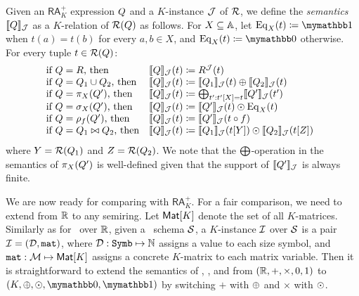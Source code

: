 Given an $\mathsf{RA}_{K}^+$ expression $Q$ and a $K$-instance $\mathcal{J}$ of $\mathcal{R}$, we define the \textit{semantics} $\llbracket Q \rrbracket_{\mathcal{J}}$ as a $K$-relation of $\mathcal{R}(Q)$ as follows. For $X \subseteq \mathbb{A}$, let $\operatorname{Eq}_X(t)\coloneqq  \kone$ when $t(a) = t(b)$ for every $a, b \in X$, and $\operatorname{Eq}_X(t)\coloneqq  \kzero$ otherwise. For every tuple $t \in \mathcal{R}(Q)$:
$$
\begin{array}{ll}
\!\!\!\text{if $\arae = R$, then} & \ssem{\arae}{\cJ}(t)\coloneqq  R^\cJ(t) \\
\!\!\!\text{if $\arae = \arae_1 \cup \arae_2$, then} & \ssem{\arae}{\cJ}(t)\coloneqq  \ssem{\arae_1}{\cJ}(t) \ksum \ssem{\arae_2}{\cJ}(t)  \\
\!\!\!\text{if $\arae = \pi_X(\arae')$, then} & \ssem{\arae}{\cJ}(t)\coloneqq  \bigksum_{t': t'[X] = t} \ssem{\arae'}{\cJ}(t') \\
\!\!\!\text{if $\arae = \sigma_X(\arae')$, then} & \ssem{\arae}{\cJ}(t)\coloneqq  
\ssem{\arae'}{\cJ}(t) \kprod \operatorname{Eq}_X(t)  \\
\!\!\!\text{if $\arae = \rho_f(\arae')$, then} & \ssem{\arae}{\cJ}(t)\coloneqq  
\ssem{\arae'}{\cJ}(t \circ f)  
\\
\!\!\!\text{if $\arae = \arae_1 \bowtie \arae_2$, then} & \ssem{\arae}{\cJ}(t)\coloneqq   \ssem{\arae_1}{\cJ}(t[Y]) \kprod  \ssem{\arae_2}{\cJ}(t[Z])
\end{array}
$$
where $Y = \mathcal{R}(Q_1)$ and $Z = \mathcal{R}(Q_2)$. We note that the $\bigoplus$-operation in the semantics of $\pi_X(Q')$ is well-defined given that the support of $\llbracket Q' \rrbracket_{\mathcal{J}}$ is always finite. 

We are now ready for comparing \langsum with $\mathsf{RA}_{K}^+$. For a fair comparison, we need to extend \langsum from $\mathbb{R}$ to any semiring. Let $\textsf{Mat}[K]$ denote the set of all $K$-matrices. 
Similarly as for \lang\ over $\mathbb{R}$, given a \lang\ schema $\mathcal{S}$, a $K$-instance $\mathcal{I}$ over $\mathcal{S}$ is a pair $\mathcal{I} = (\mathcal{D},\texttt{mat})$, where $\mathcal{D} : \texttt{Symb} \mapsto \mathbb{N}$ assigns a value to each size symbol, and $\texttt{mat} : \mathcal{M} \mapsto \textsf{Mat}[K]$ assigns a concrete $K$-matrix to each matrix variable. Then it is straightforward to extend the semantics of \lang, \langfor, and \langsum from $(\mathbb{R}, +, \times, 0, 1)$ to $(K, \ksum, \kprod, \kzero, \kone)$ by switching $+$ with $\oplus$ and $\times$ with $\odot$. 

